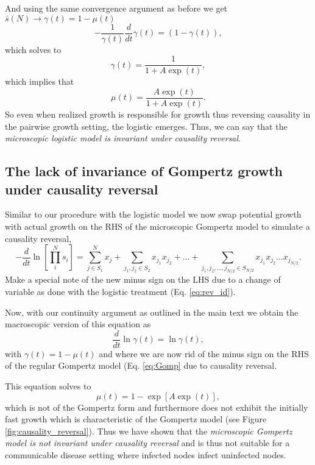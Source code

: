 \documentclass{article}
\begin{document}
And using the same convergence argument as before we get $\bar{s}(N) \rightarrow \gamma(t) = 1 - \mu(t)$
\begin{equation}
  -\frac{1}{\gamma(t)}\frac{d}{dt}\gamma(t) = (1-\gamma(t)),
\end{equation}
which solves to 
\begin{equation}
  \gamma(t) = \frac{1}{1 + A \exp(t)},
\end{equation}
which implies that
\begin{equation}
  \mu(t) = \frac{A \exp(t)}{1 + A \exp(t)}.
\end{equation}
So even when realized growth is responsible for growth thus reversing causality in the pairwise growth setting, the logistic emerges. Thus, we can say that the \textit{microscopic logistic model is invariant under causality reversal}.

\subsection{The lack of invariance of Gompertz growth under causality reversal}
\label{appendix:swappinggompertz}
Similar to our procedure with the logistic model we now swap potential growth with actual growth on the RHS of the microscopic Gompertz model to simulate a causality reversal,
\begin{equation}
\label{eq:MicroGompRev}
-\frac{d}{dt} \ln \left[ \prod_i^N s_i \right ] = \sum_{j\in S_1}^N x_{j} + \sum_{j_1, j_2 \in S_2} x_{j_1}x_{j_2} + ... + \sum_{j_1, j_2, ..., j_{N/2} \in S_{N/2}} x_{j_1}x_{j_2}\dots x_{j_{N/2}}.
\end{equation}
Make a special note of the new minus sign on the LHS due to a change of variable as done with the logistic treatment (Eq. \ref{eq:rev_id}).

Now, with our continuity argument as outlined in the main text we obtain the macroscopic version of this equation as
\begin{equation}
  \frac{d}{dt}\ln \gamma(t) = \ln \gamma(t),
\end{equation}
with $\gamma(t) = 1-\mu(t)$ and where we are now rid of the minus sign on the RHS of the regular Gompertz model (Eq. \ref{eq:Gomp} due to causality reversal.

This equation solves to
\begin{equation}
  \mu(t) = 1 - \exp\left[ A\exp(t)\right],
\end{equation}
which is not of the Gompertz form and furthermore does not exhibit the initially fast growth which is characteristic of the Gompertz model (see Figure \ref{fig:causality_reversal}). Thus we have shown that the \textit{microscopic Gompertz model is not invariant under causality reversal} and is thus not suitable for a communicable disease setting where infected nodes infect uninfected nodes.
\end{document}
